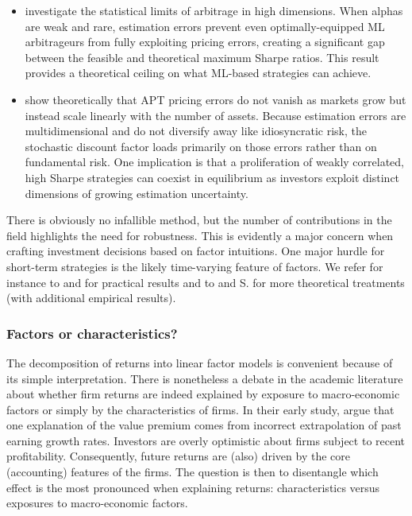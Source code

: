 \begin{itemize}
\item \cite{danagel2024statistical} investigate the statistical limits of arbitrage in high dimensions. When alphas are weak and rare, estimation errors prevent even optimally-equipped ML arbitrageurs from fully exploiting pricing errors, creating a significant gap between the feasible and theoretical maximum Sharpe ratios. This result provides a theoretical ceiling on what ML-based strategies can achieve.
\item \cite{davis2026complexity} show theoretically that APT pricing errors do not vanish as markets grow but instead scale linearly with the number of assets. Because estimation errors are multidimensional and do not diversify away like idiosyncratic risk, the stochastic discount factor loads primarily on those errors rather than on fundamental risk. One implication is that a proliferation of weakly correlated, high Sharpe strategies can coexist in equilibrium as investors exploit distinct dimensions of growing estimation uncertainty.
\end{itemize}

There is obviously no infallible method, but the number of contributions in the field highlights the need for robustness. This is evidently a major concern when crafting investment decisions based on factor intuitions. One major hurdle for short-term strategies is the likely time-varying feature of factors. We refer for instance to \cite{ang2012testing} and \cite{cooper2018new} for practical results and to \cite{gagliardini2016time} and S. \cite{ma2018testing} for more theoretical treatments (with additional empirical results).

\subsubsection{Factors or characteristics?}

The decomposition of returns into linear factor models is convenient because of its simple interpretation. There is nonetheless a debate in the academic literature about whether firm returns are indeed explained by exposure to macro-economic factors or simply by the characteristics of firms. In their early study, \cite{lakonishok1994contrarian} argue that one explanation of the value premium comes from incorrect extrapolation of past earning growth rates. Investors are overly optimistic about firms subject to recent profitability. Consequently, future returns are (also) driven by the core (accounting) features of the firms. The question is then to disentangle which effect is the most pronounced when explaining returns: characteristics versus exposures to macro-economic factors.

